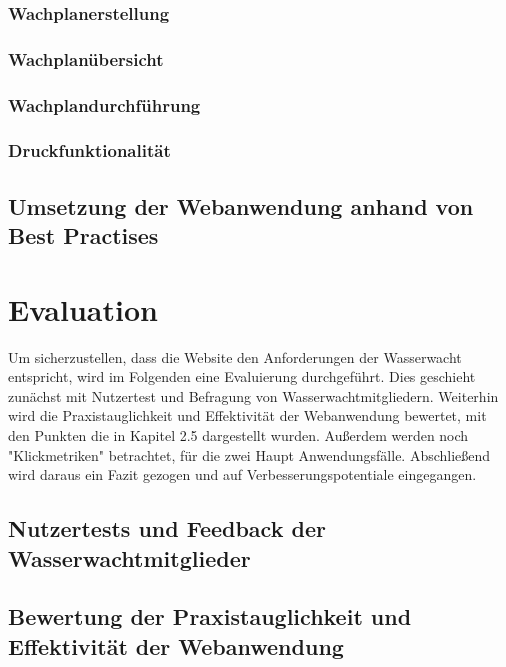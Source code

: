 \documentclass[fontsize=12pt,openright,oneside,paper=a4,BCOR=1cm]{scrbook}
\begin{document}
\subsection{Wachplanerstellung}



\subsection{Wachplanübersicht}

\subsection {Wachplandurchführung}

\subsection{Druckfunktionalität}


\section{Umsetzung der Webanwendung anhand von Best Practises}


%
%

\renewcommand{\cleardoublepage}{}
\chapter{Evaluation}

Um sicherzustellen, dass die Website den Anforderungen der Wasserwacht entspricht, wird im Folgenden eine Evaluierung durchgeführt. Dies geschieht zunächst mit Nutzertest und Befragung von Wasserwachtmitgliedern. Weiterhin wird die Praxistauglichkeit und Effektivität der Webanwendung bewertet, mit den Punkten die in Kapitel 2.5 dargestellt wurden. Außerdem werden noch "Klickmetriken" betrachtet, für die zwei Haupt Anwendungsfälle. Abschließend wird daraus ein Fazit gezogen und auf Verbesserungspotentiale eingegangen. 

\section{Nutzertests und Feedback der Wasserwachtmitglieder}

\section{Bewertung der Praxistauglichkeit und Effektivität der Webanwendung}
\end{document}
